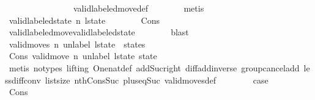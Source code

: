 \begin{isabellebody}
\ \ \ \ \ \ \isamarkupfalse%
\ {\isacharasterisk}{\isacharasterisk}\isanewline
\ \ \ \ \ \ \isamarkupfalse%
\ valid{\isacharunderscore}labeled{\isacharunderscore}move{\isacharunderscore}def\isanewline
\ \ \ \ \ \ \isamarkupfalse%
\ metis\isanewline
\ \ \ \ \isamarkupfalse%
\ \isamarkupfalse%
\ {\isachardoublequoteopen}valid{\isacharunderscore}labeled{\isacharunderscore}state\ n\ {\isacharquery}l{\isacharunderscore}state{\isacharprime}{\isachardoublequoteclose}\isanewline
\ \ \ \ \ \ \isamarkupfalse%
\ Cons{\isacharparenleft}{}{\isacharparenright}\isanewline
\ \ \ \ \ \ \isamarkupfalse%
\ valid{\isacharunderscore}labeled{\isacharunderscore}move{\isacharunderscore}valid{\isacharunderscore}labeled{\isacharunderscore}state\isanewline
\ \ \ \ \ \ \isamarkupfalse%
\ blast\isanewline
\ \ \isamarkupfalse%
\isanewline
\ \ \ \ \isamarkupfalse%
\ {\isachardoublequoteopen}valid{\isacharunderscore}moves\ n\ {\isacharparenleft}unlabel\ {\isacharquery}l{\isacharunderscore}state{\isacharprime}\ {\isacharhash}\ states{\isacharparenright}{\isachardoublequoteclose}\isanewline
\ \ \ \ \ \ \isamarkupfalse%
\ Cons{\isacharparenleft}{}{\isacharparenright}\ {\isacharbackquoteopen}valid{\isacharunderscore}move\ n\ {\isacharparenleft}unlabel\ l{\isacharunderscore}state{\isacharparenright}\ state{\isacharprime}{\isacharbackquoteclose}\isanewline
\ \ \ \ \ \ \isamarkupfalse%
\ {\isacharasterisk}\isanewline
\ \ \ \ \ \ \isamarkupfalse%
\ {\isacharparenleft}metis\ {\isacharparenleft}no{\isacharunderscore}types{\isacharcomma}\ lifting{\isacharparenright}\ One{\isacharunderscore}nat{\isacharunderscore}def\ add{\isacharunderscore}Suc{\isacharunderscore}right\ diff{\isacharunderscore}add{\isacharunderscore}inverse{}\ group{\isacharunderscore}cancel{\isachardot}add{}\ less{\isacharunderscore}diff{\isacharunderscore}conv\ list{\isachardot}size{\isacharparenleft}{}{\isacharparenright}\ nth{\isacharunderscore}Cons{\isacharunderscore}Suc\ plus{\isacharunderscore}{}{\isacharunderscore}eq{\isacharunderscore}Suc\ valid{\isacharunderscore}moves{\isacharunderscore}def{\isacharparenright}\isanewline
\ \ \isamarkupfalse%
\isanewline
\ \ \isamarkupfalse%
\ \isamarkupfalse%
\ {\isacharquery}case\isanewline
\ \ \ \ \isamarkupfalse%
\ Cons{\isacharparenleft}{}{\isacharparenright}\isanewline

\end{isabellebody}
